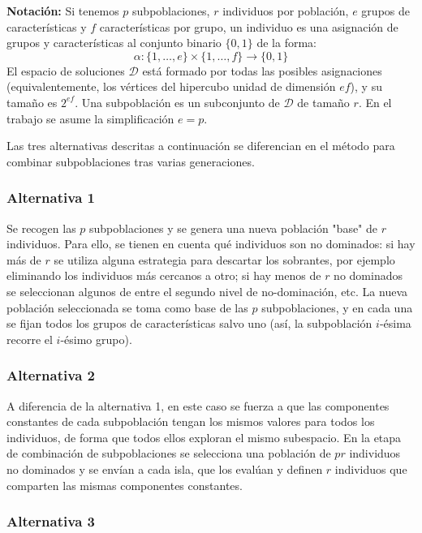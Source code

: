 \documentclass{article}
\begin{document}
\textbf{Notación:} Si tenemos $p$ subpoblaciones, $r$ individuos por población, $e$ grupos de características y $f$ características por grupo, un individuo es una asignación de grupos y características al conjunto binario $\{0, 1\}$ de la forma:
$$ \alpha:\{1,\dots,e\}\times\{1,\dots,f\}\rightarrow\{0,1\}$$
El espacio de soluciones $\mathcal D$ está formado por todas las posibles asignaciones (equivalentemente, los vértices del hipercubo unidad de dimensión $ef$), y su tamaño es $2^{ef}$. Una subpoblación es un subconjunto de $\mathcal D$ de tamaño $r$. En el trabajo se asume la simplificación $e=p$.

Las tres alternativas descritas a continuación se diferencian en el método para combinar subpoblaciones tras varias generaciones.

\subsubsection{Alternativa 1}
\label{sec-1-4-1}

Se recogen las $p$ subpoblaciones y se genera una nueva población "base" de $r$ individuos. Para ello, se tienen en cuenta qué individuos son no dominados: si hay más de $r$ se utiliza alguna estrategia para descartar los sobrantes, por ejemplo eliminando los individuos más cercanos a otro; si hay menos de $r$ no dominados se seleccionan algunos de entre el segundo nivel de no-dominación, etc. La nueva población seleccionada se toma como base de las $p$ subpoblaciones, y en cada una se fijan todos los grupos  de características salvo uno (así, la subpoblación $i$-ésima recorre el $i$-ésimo grupo).

\subsubsection{Alternativa 2}
\label{sec-1-4-2}

A diferencia de la alternativa 1, en este caso se fuerza a que las componentes constantes de cada subpoblación tengan los mismos valores para todos los individuos, de forma que todos ellos exploran el mismo subespacio. En la etapa de combinación de subpoblaciones se selecciona una población de $pr$ individuos no dominados y se envían a cada isla, que los evalúan y definen $r$ individuos que comparten las mismas componentes constantes.

\subsubsection{Alternativa 3}
\label{sec-1-4-3}
\end{document}
